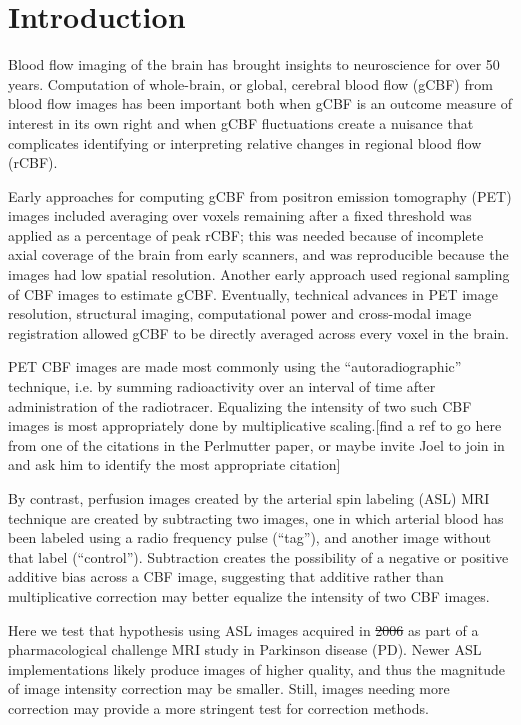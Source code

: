 \section{Introduction}
Blood flow imaging of the brain has brought insights to neuroscience for over 50 years.\cite{Taber_2005} Computation of whole-brain, or global, cerebral blood flow (gCBF) from blood flow images has been important both when gCBF is an outcome measure of interest in its own right and when gCBF fluctuations create a nuisance that complicates identifying or interpreting relative changes in regional blood flow (rCBF).\cite{Small_2004} 

Early approaches for computing gCBF from positron emission tomography (PET) images included averaging over voxels remaining after a fixed threshold was applied as a percentage of peak rCBF; this was needed because of incomplete axial coverage of the brain from early scanners, and was reproducible because the images had low spatial resolution.\cite{6609680} Another early approach used regional sampling of CBF images to estimate gCBF.\cite{6971299}\cite{Perlmutter_1985} Eventually, technical advances in PET image resolution, structural imaging, computational power and cross-modal image registration allowed gCBF to be directly averaged across every voxel in the brain.

PET CBF images are made most commonly using the ``autoradiographic'' technique, i.e. by summing radioactivity over an interval of time after administration of the radiotracer. Equalizing the intensity of two such CBF images is most appropriately done by multiplicative scaling.[find a ref to go here from one of the citations in the Perlmutter paper, or maybe invite Joel to join in and ask him to identify the most appropriate citation] 

By contrast, perfusion images created by the arterial spin labeling (ASL) MRI technique are created by subtracting two images, one in which arterial blood has been labeled using a radio frequency pulse (``tag''), and another image without that label (``control''). Subtraction creates the possibility of a negative or positive additive bias across a CBF image, suggesting that additive rather than multiplicative correction may better equalize the intensity of two CBF images.

Here we test that hypothesis using ASL images acquired in \sout{2006} as part of a pharmacological challenge MRI study in Parkinson disease (PD). Newer ASL implementations likely produce images of higher quality, and thus the magnitude of image intensity correction may be smaller. Still, images needing more correction may provide a more stringent test for correction methods.